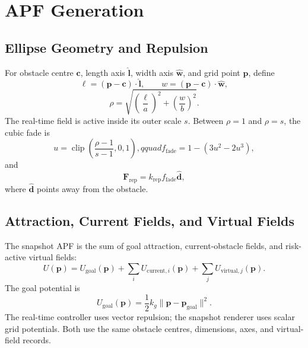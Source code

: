 \documentclass[11pt,a4paper]{article}
\begin{document}


\section{APF Generation}

\subsection{Ellipse Geometry and Repulsion}
For obstacle centre \(\bm{c}\), length axis \(\hat{\bm{l}}\), width axis \(\hat{\bm{w}}\), and grid point \(\bm{p}\), define
\[
\ell=(\bm{p}-\bm{c})\cdot\hat{\bm{l}},\qquad
w=(\bm{p}-\bm{c})\cdot\hat{\bm{w}},
\]
\[
\rho=\sqrt{\left(\frac{\ell}{a}\right)^2+\left(\frac{w}{b}\right)^2}.
\]
The real-time field is active inside its outer scale \(s\). Between \(\rho=1\) and \(\rho=s\), the cubic fade is
\[
u=\operatorname{clip}\left(\frac{\rho-1}{s-1},0,1\right),qquad
f_{\mathrm{fade}}=1-(3u^2-2u^3),
\]
and
\[
\bm{F}_{\mathrm{rep}}=k_{\mathrm{rep}}f_{\mathrm{fade}}\hat{\bm{d}},
\]
where \(\hat{\bm{d}}\) points away from the obstacle.





\subsection{Attraction, Current Fields, and Virtual Fields}
The snapshot APF is the sum of goal attraction, current-obstacle fields, and risk-active virtual fields:
\[
U(\bm{p})=U_{\mathrm{goal}}(\bm{p})+
\sum_iU_{\mathrm{current},i}(\bm{p})+
\sum_jU_{\mathrm{virtual},j}(\bm{p}).
\]
The goal potential is
\[
U_{\mathrm{goal}}(\bm{p})=\frac12k_g\|\bm{p}-\bm{p}_{\mathrm{goal}}\|^2.
\]
The real-time controller uses vector repulsion; the snapshot renderer uses scalar grid potentials. Both use the same obstacle centres, dimensions, axes, and virtual-field records.



\end{document}
